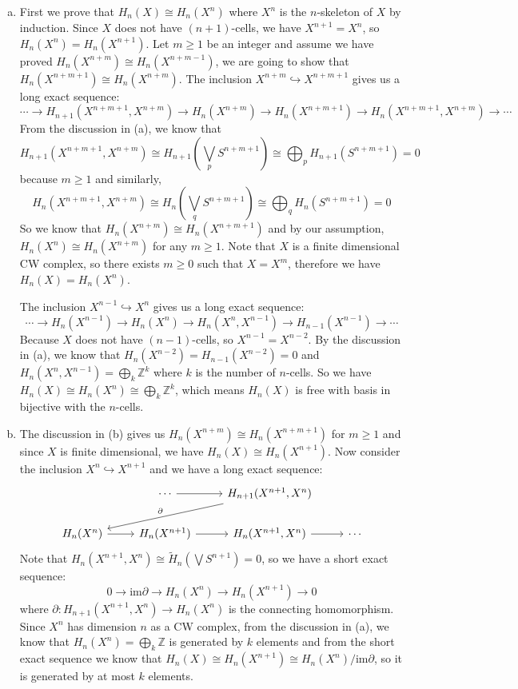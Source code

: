 \documentclass[a4paper, 12pt]{article}
\begin{document}
\begin{solution}
\begin{enumerate}[(a)]
\item First we prove that \(H_n(X)\cong H_n(X^n)\) where \(X^n\) is the \(n\)-skeleton of \(X\) by induction. Since \(X\) does not have \((n+1)\)-cells, we have \(X^{n+1}=X^n\), so \(H_n(X^n)=H_n(X^{n+1})\). Let \(m\geq 1\) be an integer and 
      assume we have proved \(H_n(X^{n+m})\cong H_n(X^{n+m-1})\), we are going to show that \(H_n(X^{n+m+1})\cong H_n(X^{n+m})\). The inclusion \(X^{n+m}\hookrightarrow X^{n+m+1}\) gives us a long exact sequence:
	  \[\cdots\rightarrow H_{n+1}(X^{n+m+1},X^{n+m})\rightarrow H_n(X^{n+m})\rightarrow H_n(X^{n+m+1})\rightarrow H_n(X^{n+m+1},X^{n+m})\rightarrow \cdots\]
	  From the discussion in (a), we know that 
	  \[H_{n+1}(X^{n+m+1},X^{n+m})\cong H_{n+1}(\bigvee_p S^{n+m+1})\cong \bigoplus_p H_{n+1}(S^{n+m+1})=0\]
	  because \(m\geq 1\) and similarly,
	  \[H_n(X^{n+m+1},X^{n+m})\cong H_n(\bigvee_q S^{n+m+1})\cong \bigoplus_q H_n(S^{n+m+1})=0\] 
      So we know that \(H_n(X^{n+m})\cong H_n(X^{n+m+1})\) and by our assumption, \(H_n(X^n)\cong H_n(X^{n+m})\) for any \(m\geq 1\). Note that \(X\) is a finite dimensional CW complex, so there exists \(m\geq 0\) such that \(X=X^m\), therefore we 
	  have \(H_n(X)=H_n(X^n)\).
	\par 
	The inclusion \(X^{n-1}\hookrightarrow X^n\) gives us a long exact sequence:
	\[\cdots\rightarrow H_n(X^{n-1})\rightarrow H_n(X^n)\rightarrow H_n(X^n,X^{n-1})\rightarrow H_{n-1}(X^{n-1})\rightarrow \cdots\]
	Because \(X\) does not have \((n-1)\)-cells, so \(X^{n-1}=X^{n-2}\). By the discussion in (a), we know that \(H_n(X^{n-2})=H_{n-1}(X^{n-2})=0\) and \(H_n(X^n,X^{n-1})=\bigoplus_k \mathbb{Z}^k\) where \(k\) is the number of \(n\)-cells. So we have 
	\(H_n(X)\cong H_n(X^n)\cong \bigoplus_k \mathbb{Z}^k\), which means \(H_n(X)\) is free with basis in bijective with the \(n\)-cells.
\item The discussion in (b) gives us \(H_n(X^{n+m})\cong H_n(X^{n+m+1})\) for \(m\geq 1\) and since \(X\) is finite dimensional, we have \(H_n(X)\cong H_n(X^{n+1})\). Now consider the inclusion \(X^n\hookrightarrow X^{n+1}\) and we have a long exact sequence:
      \[\begin{tikzcd}
	& \cdots & {H_{n+1}(X^{n+1},X^n)} \\
	{H_n(X^n)} & {H_n(X^{n+1})} & {H_n(X^{n+1},X^n)} & \cdots
	\arrow[from=1-2, to=1-3]
	\arrow["\partial"', from=1-3, to=2-1]
	\arrow[from=2-1, to=2-2]
	\arrow[from=2-2, to=2-3]
	\arrow[from=2-3, to=2-4]
\end{tikzcd}\]
Note that \(H_n(X^{n+1},X^n)\cong \tilde{H}_n(\bigvee S^{n+1})=0\), so we have a short exact sequence:
\[0\rightarrow \text{im}\partial \rightarrow H_n(X^n)\rightarrow H_n(X^{n+1})\rightarrow 0\]
where \(\partial:H_{n+1}(X^{n+1},X^n)\rightarrow H_n(X^n)\) is the connecting homomorphism. Since \(X^n\) has dimension \(n\) as a CW complex, from the discussion in (a), we know that \(H_n(X^n)=\bigoplus_k \mathbb{Z}\) is generated by \(k\) elements and from the 
short exact sequence we know that \(H_n(X)\cong H_n(X^{n+1})\cong H_n(X^n)/\text{im}\partial\), so it is generated by at most \(k\) elements.
\end{enumerate}
\end{solution}
\end{document}
